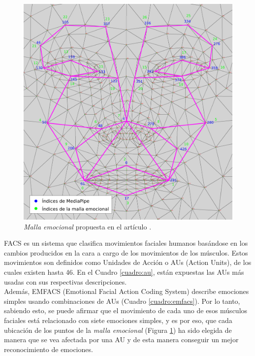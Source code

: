 \begin{figure} [h!]
  \begin{center}
    \includegraphics[width=13cm]{figs/emotional_mesh.png}
  \end{center}
  \captionsetup{justification=centering}
  \caption{\textit{Malla emocional} propuesta en el artículo \cite{mediapipe_emotions}.}
  \label{fig:malla_emocional}
\end{figure}

FACS es un sistema que clasifica movimientos faciales humanos basándose en los cambios producidos en la cara a cargo de los movimientos de los músculos. Estos movimientos son definidos como Unidades de Acción o AUs (Action Units), de los cuales existen hasta 46. En el Cuadro \ref{cuadro:au}, están expuestas las AUs más usadas con sus respectivas descripciones.\\

Además, EMFACS (Emotional Facial Action Coding System) describe emociones simples usando combinaciones de AUs (Cuadro \ref{cuadro:emfacs}). Por lo tanto, sabiendo esto, se puede afirmar que el movimiento de cada uno de esos músculos faciales está relacionado con siete emociones simples, y es por eso, que cada ubicación de los puntos de la \textit{malla emocional} (Figura \ref{fig:malla_emocional}) ha sido elegida de manera que se vea afectada por una AU y de esta manera conseguir un mejor reconocimiento de emociones.\\

